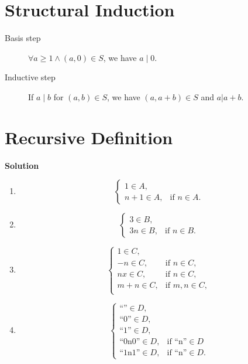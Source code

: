 \documentclass{../../cls/sig-alternate-05-2015}
\begin{document}
\section{Structural Induction}
\begin{description}
    \item[Basis step] $\forall a \ge 1 \land (a, 0) \in S$, we have $a \mid 0$.
    \item[Inductive step] If $a \mid b$ for $(a, b) \in S$, we have $(a, a + b) \in S$ and $a | a + b$.
\end{description}

\section{Recursive Definition}
\textbf{Solution}\begin{enumerate}[label=(\alph*)]
    \item \begin{equation}
        \begin{cases}
        1 \in A, &\\
        n + 1 \in A, & \text{if } n \in A.
        \end{cases}
    \end{equation}
    \item \begin{equation}
    \begin{cases}
    3 \in B, &\\
    3n \in B, & \text{if } n \in B.
    \end{cases}
    \end{equation}
    \item \begin{equation}
        \begin{cases}
        1 \in C, &\\
        -n \in C, & \text{if } n \in C,\\
        nx \in C, & \text{if } n \in C,\\
        m + n \in C, & \text{if } m, n \in C,\\
        \end{cases}
    \end{equation}
    \item \begin{equation}
        \begin{cases}
        \text{``''} \in D, &\\
        \text{``0''} \in D, &\\
        \text{``1''} \in D, &\\
        \text{``0n0''} \in D, & \text{if ``n''} \in D\\
        \text{``1n1''} \in D, & \text{if ``n''} \in D.
        \end{cases}
    \end{equation}
\end{enumerate}
\end{document}
